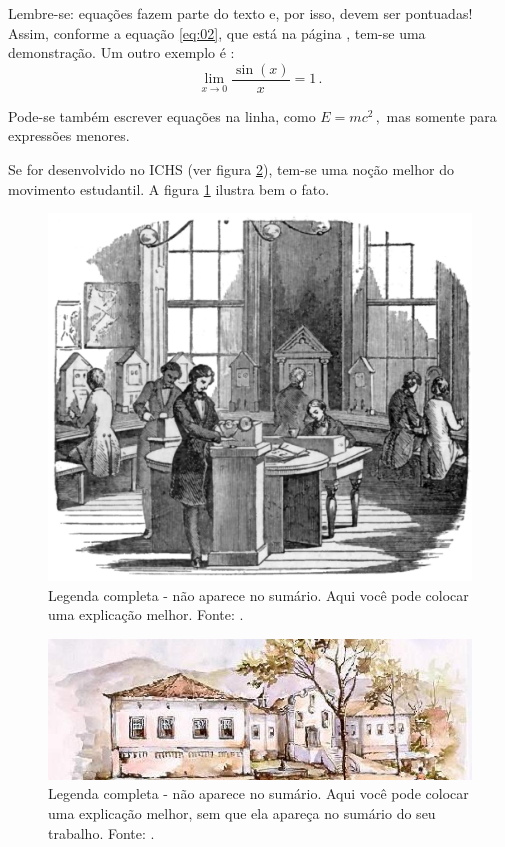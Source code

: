 \documentclass[
	12pt,				%
	openright,			%
	oneside,			%
	a4paper,			%
	english,			%
	brazil				%
	]{abntex2}
\begin{document}
Lembre-se: equações fazem parte do texto e, por isso, devem ser pontuadas! Assim, conforme a equação \eqref{eq:02}, que está na página \pageref{eq:02}, tem-se uma demonstração. Um outro exemplo é :
\begin{equation}
\lim\limits_{x \to 0} \frac{\sin (x)}{x} = 1 \,. 
\label{eq:02}
\end{equation}

Pode-se também escrever equações na linha, como $E = m c^2\,,$ mas somente para expressões menores.

Se for desenvolvido no ICHS (ver figura \ref{fig:309}), tem-se uma noção melhor do movimento estudantil. A figura \ref{fig:308} ilustra bem o fato.

\begin{figure}[h] %
	\centering
	\includegraphics[scale=0.3]{fig09.pdf} %
	\caption[Legenda reduzida. Aparece apenas no sumário]{Legenda completa - não aparece no sumário. Aqui você pode colocar uma explicação melhor. Fonte: \textcite{boyle1772}.}
	\label{fig:308}
\end{figure}

\lipsum[22]

\begin{figure}[h]
	\centering
	\includegraphics[scale=0.4]{ichs2.jpg} %
	\caption[Legenda reduzida - aparece apenas no sumário]{Legenda completa - não aparece no sumário. Aqui você pode colocar uma explicação melhor, sem que ela apareça no sumário do seu trabalho. Fonte: \cite[p.~117]{boyle1772}.}
	\label{fig:309}
\end{figure}
\end{document}

